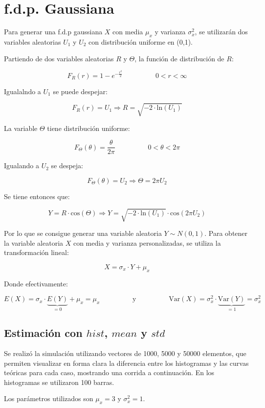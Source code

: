 



\tableofcontents
\newpage

\section{f.d.p. Gaussiana}

Para generar una f.d.p gaussiana $X$ con media $\mu_x$ y varianza $\sigma^2_x$, se utilizarán dos variables aleatorias $U_1$ y $U_2$ con distribución uniforme en (0,1).\par
Partiendo de dos variables aleatorias $R$ y $\Theta$, la función de distribución de $R$:

\[
F_R(r) = 1 - e^{-\frac{r^2}{2}} \hspace{2cm} 0<r<\infty
\]

Igualalndo a $U_1$ se puede despejar:

\[
F_R(r) = U_1 \Longrightarrow R = \sqrt{-2 \cdot \textrm{ln}(U_1)}
\]

La variable $\Theta$ tiene distribución uniforme:

\[
F_{\Theta}(\theta) = \frac{\theta}{2\pi} \hspace{2cm} 0<\theta<2\pi
\] 

Igualando a $U_2$ se despeja:

\[
F_{\Theta}(\theta) = U_2 \Longrightarrow \Theta = 2 \pi U_2
\]

Se tiene entonces que:

\[
Y = R \cdot \textrm{cos}(\Theta) \Longrightarrow Y = \sqrt{-2 \cdot \textrm{ln}(U_1)} \cdot \textrm{cos}(2 \pi U_2)
\]

Por lo que se consigue generar una variable aleatoria $Y\sim N(0,1)$. Para obtener la variable aleatoria $X$ con media y varianza personalizadas, se utiliza la transformación lineal:

\[
X = \sigma_x \cdot Y + \mu_x
\]
\par
Donde efectivamente:

\[
E(X) = \sigma_x \cdot \underbrace{E(Y)}_{=0} + \mu_x = \mu_x \hspace{2cm} \textrm{y} \hspace{2cm} \textrm{Var}(X) = \sigma^2_x \cdot \underbrace{\textrm{Var}(Y)}_{=1} = \sigma^2_x 
\]

\subsection{Estimación con $hist$, $mean$ y $std$}
Se realiz\'o la simulación utilizando vectores de 1000, 5000 y 50000 elementos, que permiten visualizar en forma clara la diferencia entre los histogramas y las curvas te\'oricas para cada caso, mostrando una corrida a continuación. En los histogramas se utilizaron 100 barras.\par
Los par\'ametros utilizados son $\mu_x = 3$ y $\sigma^2_x = 1$.

